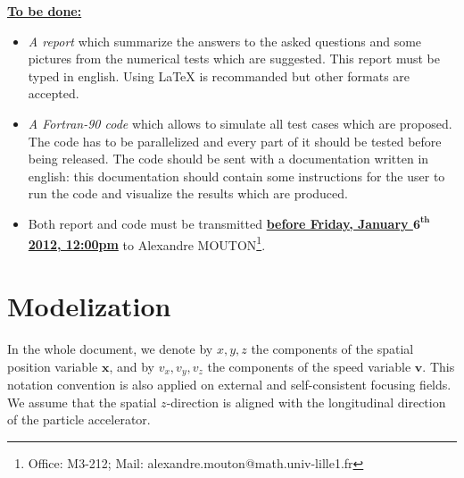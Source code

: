 \documentclass[10pt]{article}
\begin{document}
\textbf{\underline{To be done:}}
\begin{itemize}
\item \textit{A report} which summarize the answers to the asked questions and some pictures from the numerical tests which are suggested. This report must be typed in english. Using LaTeX is recommanded but other formats are accepted.
\item \textit{A Fortran-90 code} which allows to simulate all test cases which are proposed. The code has to be parallelized and every part of it should be tested before being released. The code should be sent with a documentation written in english: this documentation should contain some instructions for the user to run the code and visualize the results which are produced.
\item Both report and code must be transmitted \textbf{\underline{before Friday, January $\mathbf{6^{\textbf{th}}}$ 2012, 12:00pm}} to Alexandre MOUTON\footnote{Office: M3-212; Mail: alexandre.mouton@math.univ-lille1.fr}.
\end{itemize}




\section{Modelization}
\setcounter{equation}{0}

\indent In the whole document, we denote by $x,y,z$ the components of the spatial position variable $\mathbf{x}$, and by $v_{x},v_{y},v_{z}$ the components of the speed variable $\mathbf{v}$. This notation convention is also applied on external and self-consistent focusing fields. We assume that the spatial $z$-direction is aligned with the longitudinal direction of the particle accelerator. \\
\end{document}
